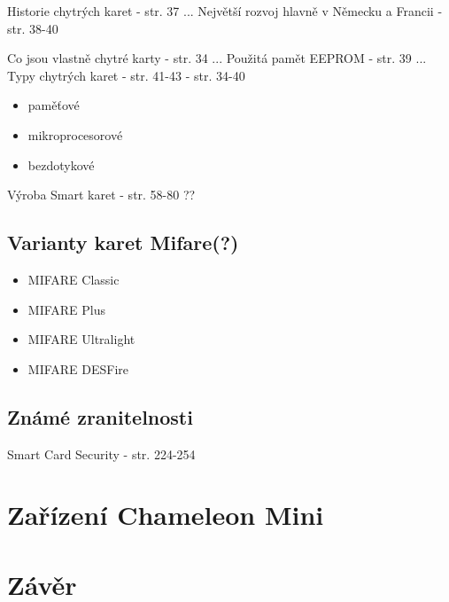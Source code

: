 Historie chytrých karet \cite{Smart_card_handbook} {-} str. 37 ...
Největší rozvoj hlavně v Německu a Francii\cite{Smart_card_handbook} {-} str. 38-40
\par 
Co jsou vlastně chytré karty \cite{Smart_Cards_Tokens_Security} {-} str. 34 ... 
Použitá pamět EEPROM \cite{Smart_card_handbook} {- str. 39} ... 
Typy chytrých karet\cite{Smart_card_handbook}{ - str. 41-43} \cite{Smart_Cards_Tokens_Security}{ - str. 34-40}

\begin{itemize}
    \item paměťové
    \item mikroprocesorové
    \item bezdotykové
\end{itemize}

\par
Výroba Smart karet \cite{Smart_Cards_Tokens_Security}{ - str. 58-80} ??

\section{Varianty karet Mifare(?)}

\begin{itemize}
  \item MIFARE Classic 
  \item MIFARE Plus
  \item MIFARE Ultralight 
  \item MIFARE DESFire
\end{itemize}

\section{Známé zranitelnosti}

Smart Card Security \cite{Smart_Cards_Tokens_Security}{ - str. 224-254}

\chapter{Zařízení Chameleon Mini}
\label{zarizeni_chameleon_mini}







\chapter{Závěr}
\label{zaver}


